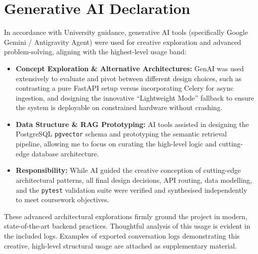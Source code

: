 \documentclass[11pt,a4paper]{article}
\begin{document}
\section{Generative AI Declaration}
In accordance with University guidance, generative AI tools (specifically Google Gemini / Antigravity Agent) were used for creative exploration and advanced problem-solving, aligning with the highest-level usage band:
\begin{itemize}[leftmargin=1.2em]
  \item \textbf{Concept Exploration \& Alternative Architectures:} GenAI was used extensively to evaluate and pivot between different design choices, such as contrasting a pure FastAPI setup versus incorporating Celery for async ingestion, and designing the innovative ``Lightweight Mode'' fallback to ensure the system is deployable on constrained hardware without crashing.
  \item \textbf{Data Structure \& RAG Prototyping:} AI tools assisted in designing the PostgreSQL \texttt{pgvector} schema and prototyping the semantic retrieval pipeline, allowing me to focus on curating the high-level logic and cutting-edge database architecture.
  \item \textbf{Responsibility:} While AI guided the creative conception of cutting-edge architectural patterns, all final design decisions, API routing, data modelling, and the \texttt{pytest} validation suite were verified and synthesised independently to meet coursework objectives.
\end{itemize}

These advanced architectural explorations firmly ground the project in modern, state-of-the-art backend practices. Thoughtful analysis of this usage is evident in the included logs. Examples of exported conversation logs demonstrating this creative, high-level structural usage are attached as supplementary material.
\end{document}
